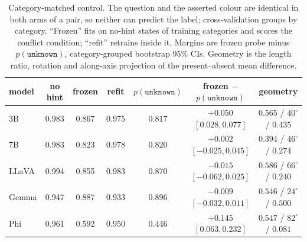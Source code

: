 \documentclass[10pt]{article}
\newcommand{\unknown}{\texttt{unknown}}
\newcommand{\punk}{p(\unknown)}
\begin{document}
\begin{table}[h]
\centering
\small
\setlength{\tabcolsep}{4pt}
\caption{Category-matched control. The question and the asserted colour are identical in both arms of a pair, so neither can predict the label; cross-validation groups by category. ``Frozen'' fits on no-hint states of training categories and scores the conflict condition; ``refit'' retrains inside it. Margins are frozen probe minus $\punk$, category-grouped bootstrap $95\%$ CIs. Geometry is the length ratio, rotation and along-axis projection of the present--absent mean difference.}
\label{tab:catmatched}
\begin{tabular}{lcccccc}
\toprule
model & no hint & frozen & refit & $\punk$ & frozen $-$ $\punk$ & geometry \\
\midrule
3B & 0.983 & 0.867 & 0.975 & 0.817 & $+0.050$ $[0.028,0.077]$ & $0.565$ / $40^\circ$ / $0.435$ \\
7B & 0.983 & 0.823 & 0.978 & 0.820 & $+0.002$ $[-0.025,0.045]$ & $0.394$ / $46^\circ$ / $0.274$ \\
LLaVA & 0.994 & 0.855 & 0.983 & 0.870 & $-0.015$ $[-0.062,0.025]$ & $0.586$ / $66^\circ$ / $0.240$ \\
Gemma & 0.947 & 0.887 & 0.933 & 0.896 & $-0.009$ $[-0.032,0.011]$ & $0.546$ / $24^\circ$ / $0.500$ \\
Phi & 0.961 & 0.592 & 0.950 & 0.446 & $+0.145$ $[0.063,0.232]$ & $0.547$ / $82^\circ$ / $0.081$ \\
\bottomrule
\end{tabular}
\end{table}
\end{document}
